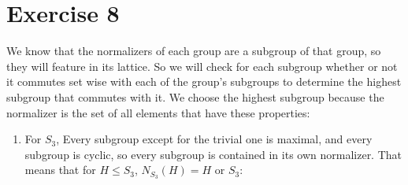 \documentclass[12pt]{article}
\newcommand{\seq}{\leqslant}
\begin{document}
    \section*{Exercise 8}
    We know that the normalizers of each group are a subgroup
    of that group,
    so they will feature in its lattice.
    So we will check for each subgroup whether or not it commutes
    set wise with each of the group's subgroups
    to determine the highest subgroup that commutes with it.
    We choose the highest subgroup because the normalizer
    is the set of all elements that have these properties:
    \begin{enumerate}[label=\textbf{\alph*.}]
        \item
            For $S_3$,
            Every subgroup except for the trivial one is maximal,
            and every subgroup is cyclic,
            so every subgroup is contained in its own normalizer.
            That means that for $H \seq S_3$,
            $N_{S_3}(H) = H$ or $S_3$:

            \begin{figure}[H]
                \centering
\end{figure}
\end{enumerate}
\end{document}
